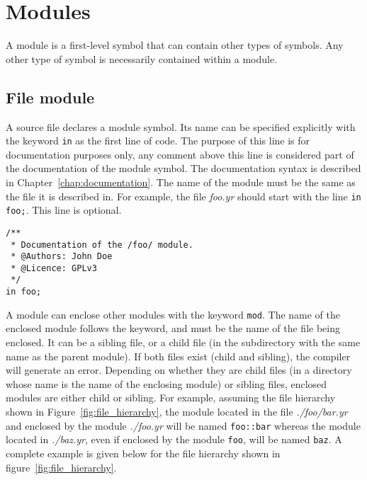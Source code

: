 \section{Modules}%
\label{sec:modules}

A module is a first-level symbol that can contain other types of symbols. Any
other type of symbol is necessarily contained within a module.

\subsection{File module}

A source file declares a module symbol. Its name can be specified explicitly
with the keyword \texttt{in} as the first line of code. The purpose of this line
is for documentation purposes only, any comment above this line is considered
part of the documentation of the module symbol. The documentation syntax is
described in Chapter~\ref{chap:documentation}. The name of the module must
be the same as the file it is described in. For example, the file
\textit{foo.yr} should start with the line \texttt{in foo;}. This line is
optional.


\begin{lstlisting}[style=coloredverbatim]
/**
 * Documentation of the /foo/ module.
 * @Authors: John Doe
 * @Licence: GPLv3
 */
in foo;
\end{lstlisting}

A module can enclose other modules with the keyword \texttt{mod}. The name of
the enclosed module follows the keyword, and must be the name of the file being
enclosed. It can be a sibling file, or a child file (in the subdirectory with
the same name as the parent module). If both files exist (child and sibling),
the compiler will generate an error. Depending on whether they are child files
(in a directory whose name is the name of the enclosing module) or sibling
files, enclosed modules are either child or sibling. For example, assuming the
file hierarchy shown in Figure~\ref{fig:file_hierarchy}, the module located in
the file \textit{./foo/bar.yr} and enclosed by the module \textit{./foo.yr} will
be named \texttt{foo::bar} whereas the module located in \textit{./baz.yr}, even
if enclosed by the module \texttt{foo}, will be named \texttt{baz}. A complete
example is given below for the file hierarchy shown in
figure~\ref{fig:file_hierarchy}.

